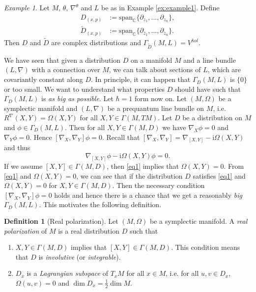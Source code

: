 \documentclass[11pt]{amsart}
\numberwithin{equation}{section}
\theoremstyle{plain}
\theoremstyle{definition}
\newtheorem{defn}{Definition}[subsection]
\theoremstyle{remark}
\newtheorem{ex}{Example}[subsection]
\newcommand{\I}{\mathrm{i}}
\begin{document}
\begin{ex}
Let $M$, $\theta$, $\nabla^\theta$ and $L$ be as in Example \ref{ex:example1}. Define
\begin{align*}
D_{(x,p)}&:=\mathrm{span}_\mathbb{C}\{\partial_{z_1},...,\partial_{z_n}\},\\
\widetilde{D}_{(x,p)}&:=\mathrm{span}_\mathbb{C}\{\partial_{\bar z_1},...,\partial_{\bar z_n}\}.
\end{align*}
Then $D$ and $\widetilde{D}$ are complex distributions and $\Gamma_{\widetilde{D}}(M,L)= V^{hol}$.
\end{ex}

We have seen that given a distribution $D$ on a manifold $M$ and a line bundle $(L,\nabla)$ with a connection over $M$, we can talk about sections of $L$, which are covariantly constant along $D$. In principle, it can happen that $\Gamma_D(M,L)$ is $\{0\}$ or too small. We want to understand what properties $D$ should have such that $\Gamma_D(M,L)$ is \emph{as big as possible}. Let $\hbar=1$ form now on. Let $(M,\Omega)$ be a symplectic manifold and $(L,\nabla)$ be a prequantum line bundle on $M$, i.e. $R^\nabla(X,Y)=\Omega(X,Y)$ for all $X,Y\in\Gamma(M,TM)$. Let $D$ be a distribution on $M$ and $\phi\in\Gamma_D(M,L)$. Then for all $X,Y\in\Gamma(M,D)$ we have $\nabla_X\phi=0$ and $\nabla_Y\phi=0$. Hence $[\nabla_X,\nabla_Y]\phi=0$. Recall that $[\nabla_X,\nabla_Y]=\nabla_{[X,Y]}-\I\Omega(X,Y)$ and thus 
\begin{equation}
\label{eq1}
\nabla_{[X,Y]}\phi-\I\Omega(X,Y)\phi=0.
\end{equation}
If we assume $[X,Y]\in\Gamma(M,D)$, then \eqref{eq1} implies that $\Omega(X,Y)=0$. From \eqref{eq1} and $\Omega(X,Y)=0$, we can see that if the distribution $D$ satisfies \eqref{eq1} and $\Omega(X,Y)=0$ for $X,Y\in\Gamma(M,D)$. Then the necessary condition $[\nabla_X,\nabla_Y]\phi=0$ holds and hence there is a chance that we get a reasonably \emph{big} $\Gamma_D(M,L)$. This motivates the following definition.

\begin{defn}[Real polarization]
Let $(M,\Omega)$ be a symplectic manifold. A \emph{real polarization} of $M$ is a real distribution $D$ such that 
\begin{enumerate}
\item{$X,Y\in\Gamma(M,D)$ implies that $[X,Y]\in\Gamma(M,D)$. This condition means that $D$ is \emph{involutive} (or \emph{integrable}).
}
\item{$D_x$ is a \emph{Lagrangian subspace} of $T_xM$ for all $x\in M$, i.e. for all $u,v\in D_x$, $\Omega(u,v)=0$ and $\dim D_x=\frac{1}{2}\dim M$.}
\end{enumerate}
\end{defn}
\end{document}
